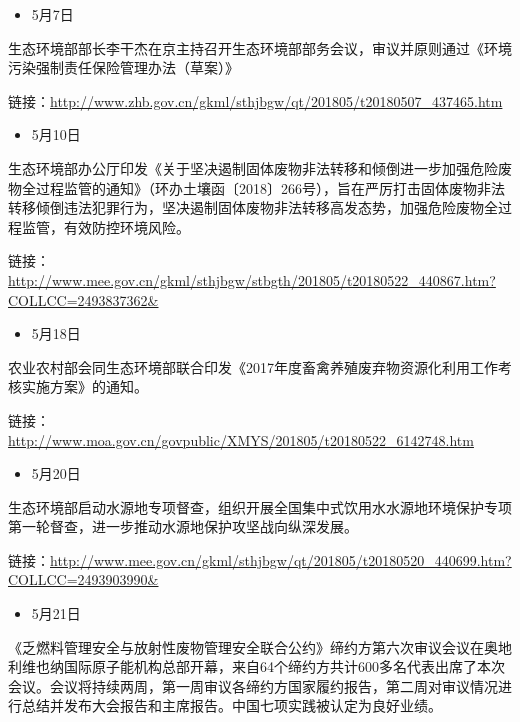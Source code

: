 \documentclass[
]{book}
\providecommand{\tightlist}{%
  \setlength{\itemsep}{0pt}\setlength{\parskip}{0pt}}
\begin{document}
\begin{itemize}
\tightlist
\item
  5月7日
\end{itemize}

生态环境部部长李干杰在京主持召开生态环境部部务会议，审议并原则通过《环境污染强制责任保险管理办法（草案）》

链接：\url{http://www.zhb.gov.cn/gkml/sthjbgw/qt/201805/t20180507_437465.htm}

\begin{itemize}
\tightlist
\item
  5月10日
\end{itemize}

生态环境部办公厅印发《关于坚决遏制固体废物非法转移和倾倒进一步加强危险废物全过程监管的通知》（环办土壤函〔2018〕266号），旨在严厉打击固体废物非法转移倾倒违法犯罪行为，坚决遏制固体废物非法转移高发态势，加强危险废物全过程监管，有效防控环境风险。

链接：\url{http://www.mee.gov.cn/gkml/sthjbgw/stbgth/201805/t20180522_440867.htm?COLLCC=2493837362\&}

\begin{itemize}
\tightlist
\item
  5月18日
\end{itemize}

农业农村部会同生态环境部联合印发《2017年度畜禽养殖废弃物资源化利用工作考核实施方案》的通知。

链接：\url{http://www.moa.gov.cn/govpublic/XMYS/201805/t20180522_6142748.htm}

\begin{itemize}
\tightlist
\item
  5月20日
\end{itemize}

生态环境部启动水源地专项督查，组织开展全国集中式饮用水水源地环境保护专项第一轮督查，进一步推动水源地保护攻坚战向纵深发展。

链接：\url{http://www.mee.gov.cn/gkml/sthjbgw/qt/201805/t20180520_440699.htm?COLLCC=2493903990\&}

\begin{itemize}
\tightlist
\item
  5月21日
\end{itemize}

《乏燃料管理安全与放射性废物管理安全联合公约》缔约方第六次审议会议在奥地利维也纳国际原子能机构总部开幕，来自64个缔约方共计600多名代表出席了本次会议。会议将持续两周，第一周审议各缔约方国家履约报告，第二周对审议情况进行总结并发布大会报告和主席报告。中国七项实践被认定为良好业绩。
\end{document}
